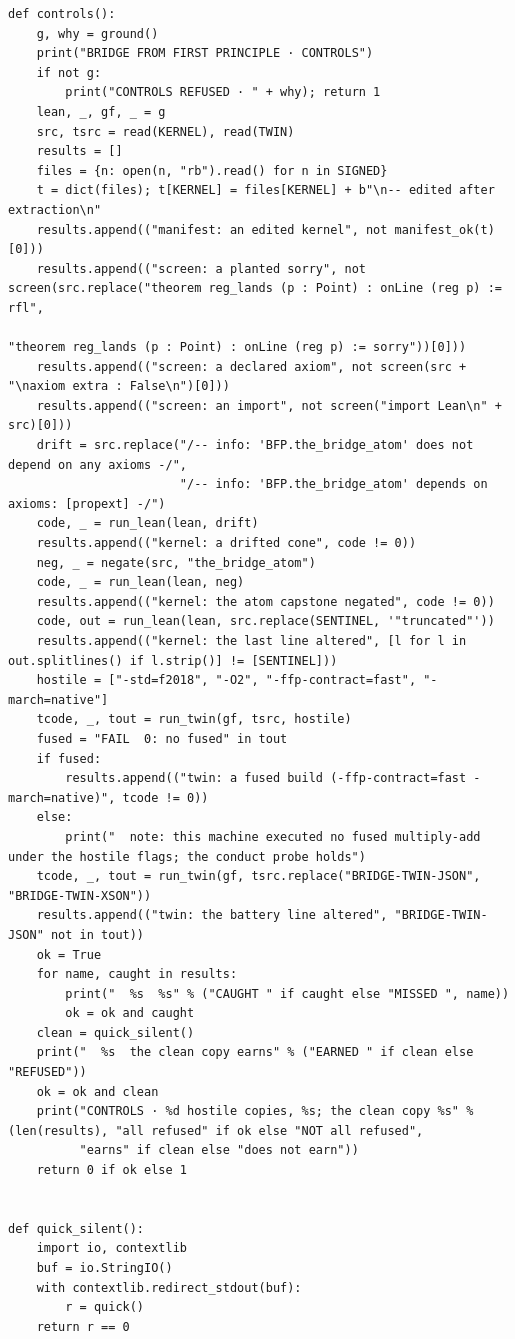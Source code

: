 \documentclass[10pt,twocolumn]{article}
\begin{document}
\begin{Verbatim}
def controls():
    g, why = ground()
    print("BRIDGE FROM FIRST PRINCIPLE · CONTROLS")
    if not g:
        print("CONTROLS REFUSED · " + why); return 1
    lean, _, gf, _ = g
    src, tsrc = read(KERNEL), read(TWIN)
    results = []
    files = {n: open(n, "rb").read() for n in SIGNED}
    t = dict(files); t[KERNEL] = files[KERNEL] + b"\n-- edited after extraction\n"
    results.append(("manifest: an edited kernel", not manifest_ok(t)[0]))
    results.append(("screen: a planted sorry", not screen(src.replace("theorem reg_lands (p : Point) : onLine (reg p) := rfl",
                                                                      "theorem reg_lands (p : Point) : onLine (reg p) := sorry"))[0]))
    results.append(("screen: a declared axiom", not screen(src + "\naxiom extra : False\n")[0]))
    results.append(("screen: an import", not screen("import Lean\n" + src)[0]))
    drift = src.replace("/-- info: 'BFP.the_bridge_atom' does not depend on any axioms -/",
                        "/-- info: 'BFP.the_bridge_atom' depends on axioms: [propext] -/")
    code, _ = run_lean(lean, drift)
    results.append(("kernel: a drifted cone", code != 0))
    neg, _ = negate(src, "the_bridge_atom")
    code, _ = run_lean(lean, neg)
    results.append(("kernel: the atom capstone negated", code != 0))
    code, out = run_lean(lean, src.replace(SENTINEL, '"truncated"'))
    results.append(("kernel: the last line altered", [l for l in out.splitlines() if l.strip()] != [SENTINEL]))
    hostile = ["-std=f2018", "-O2", "-ffp-contract=fast", "-march=native"]
    tcode, _, tout = run_twin(gf, tsrc, hostile)
    fused = "FAIL  0: no fused" in tout
    if fused:
        results.append(("twin: a fused build (-ffp-contract=fast -march=native)", tcode != 0))
    else:
        print("  note: this machine executed no fused multiply-add under the hostile flags; the conduct probe holds")
    tcode, _, tout = run_twin(gf, tsrc.replace("BRIDGE-TWIN-JSON", "BRIDGE-TWIN-XSON"))
    results.append(("twin: the battery line altered", "BRIDGE-TWIN-JSON" not in tout))
    ok = True
    for name, caught in results:
        print("  %s  %s" % ("CAUGHT " if caught else "MISSED ", name))
        ok = ok and caught
    clean = quick_silent()
    print("  %s  the clean copy earns" % ("EARNED " if clean else "REFUSED"))
    ok = ok and clean
    print("CONTROLS · %d hostile copies, %s; the clean copy %s" % (len(results), "all refused" if ok else "NOT all refused",
          "earns" if clean else "does not earn"))
    return 0 if ok else 1


def quick_silent():
    import io, contextlib
    buf = io.StringIO()
    with contextlib.redirect_stdout(buf):
        r = quick()
    return r == 0



\end{Verbatim}
\end{document}
